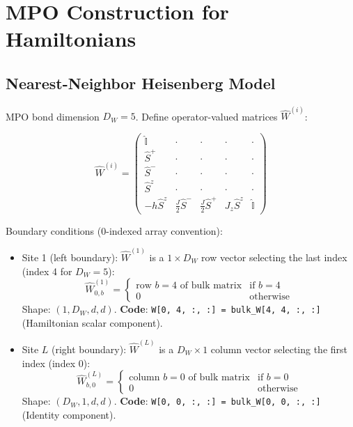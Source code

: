 \documentclass[aps,prb,onecolumn,scriptaddress]{revtex4-2}
\newcommand{\Id}{\mathbb{I}}
\begin{document}
	\section{MPO Construction for Hamiltonians}
	\label{sec:mpo}
	
	
	\subsection{Nearest-Neighbor Heisenberg Model}
	MPO bond dimension $D_W = 5$. Define operator-valued matrices $\hat{W}^{(i)}$:
	
	\begin{equation}
		\hat{W}^{(i)} = \begin{pmatrix}
			\hat{\Id} & \cdot & \cdot & \cdot & \cdot \\
			\hat{S}^+ & \cdot & \cdot & \cdot & \cdot \\
			\hat{S}^- & \cdot & \cdot & \cdot & \cdot \\
			\hat{S}^z & \cdot & \cdot & \cdot & \cdot \\
			-h\hat{S}^z & \frac{J}{2}\hat{S}^- & \frac{J}{2}\hat{S}^+ & J_z \hat{S}^z & \hat{\Id}
		\end{pmatrix}
	\end{equation}
	
Boundary conditions (0-indexed array convention):
\begin{itemize}
	\item Site 1 (left boundary): $\hat{W}^{(1)}$ is a $1 \times D_W$ row vector selecting the last index (index 4 for $D_W=5$):
	\begin{equation}
		\hat{W}^{(1)}_{0,b} = \begin{cases} \text{row } b=4 \text{ of bulk matrix} & \text{if } b=4 \\ 0 & \text{otherwise} \end{cases}
	\end{equation}
	Shape: $(1, D_W, d, d)$. \textbf{Code}: \texttt{W[0, 4, :, :] = bulk\_W[4, 4, :, :]} (Hamiltonian scalar component).
	
	\item Site $L$ (right boundary): $\hat{W}^{(L)}$ is a $D_W \times 1$ column vector selecting the first index (index 0):
	\begin{equation}
		\hat{W}^{(L)}_{b,0} = \begin{cases} \text{column } b=0 \text{ of bulk matrix} & \text{if } b=0 \\ 0 & \text{otherwise} \end{cases}
	\end{equation}
	Shape: $(D_W, 1, d, d)$. \textbf{Code}: \texttt{W[0, 0, :, :] = bulk\_W[0, 0, :, :]} (Identity component).
\end{itemize}
\end{document}
